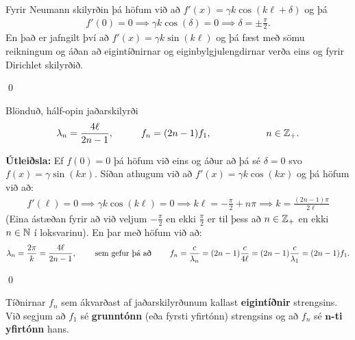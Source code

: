 Fyrir Neumann skilyrðin þá höfum við að $f'(x) = \gamma k \cos(k\ell + \delta)$ og þá
\begin{align*}
    f'(0) = 0 \implies \gamma k \cos(\delta) = 0 \implies \delta = \pm \frac{\pi}{2}. 
\end{align*}
En það er jafngilt því að $f'(x) = \gamma k \sin(k\ell)$ og þá fæst með sömu reikningum og áðan að eigintíðnirnar og eiginbylgjulengdirnar verða eins og fyrir Dirichlet skilyrðið.

\qed

\begin{tcolorbox}
\begin{theorem}
Blönduð, hálf-opin jaðarskilyrði
\begin{align*}
    \lambda_n = \frac{4\ell}{2n-1}, \hspace{1cm} f_n = (2n-1)f_1, \hspace{2cm} n \in \mathbb{Z}_+.
\end{align*}
\end{theorem}
\end{tcolorbox}

\textbf{Útleiðsla:} Ef $f(0) = 0$ þá höfum við eins og áður að þá sé $\delta = 0$ svo $f(x) = \gamma \sin(kx)$. Síðan athugum við að $f'(x) = \gamma k \cos(kx)$ og þá höfum við að:
\begin{align*}
    f'(\ell) = 0 \implies \gamma k \cos(k\ell) = 0 \implies k \ell = -\frac{\pi}{2} + n\pi \implies k = \frac{(2n-1)\pi}{2\ell}
\end{align*}
(Eina ástæðan fyrir að við veljum $-\frac{\pi}{2}$ en ekki $\frac{\pi}{2}$ er til þess að $n \in \mathbb{Z}_+$ en ekki $n \in \mathbb{N}$ í loksvarinu). En þar með höfum við að:
\begin{align*}
    \lambda_n = \frac{2\pi}{k} = \frac{4\ell}{2n-1}, \hspace{0.8cm} \text{sem gefur þá að} \hspace{0.8cm} f_n = \frac{c}{\lambda_n} = (2n-1) \frac{c}{4\ell} = (2n-1) \frac{c}{\lambda_1} = (2n-1)f_1.
\end{align*}

\qed

\begin{tcolorbox}
\begin{definition}
Tíðnirnar $f_n$ sem ákvarðast af jaðarskilyrðunum kallast \textbf{eigintíðnir} strengsins. Við segjum að $f_1$ sé \textbf{grunntónn} (eða fyrsti yfirtónn) strengsins og að $f_n$ sé \textbf{$\bm{n}$-ti yfirtónn} hans.
\end{definition}
\end{tcolorbox}

